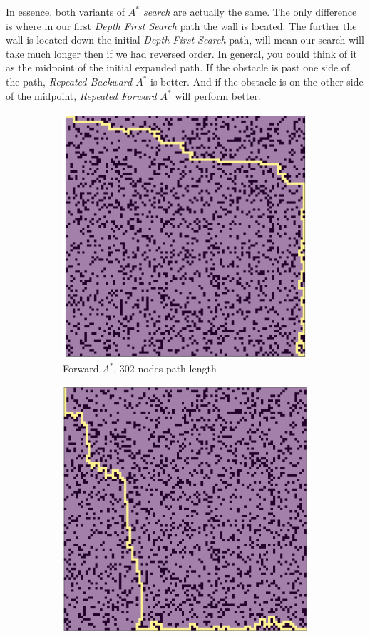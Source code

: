 In essence, both variants of \emph{$A^*$ search} are actually the same. The only difference is where in our first \emph{Depth First Search} path the wall is located. The further the wall is located down the initial \emph{Depth First Search} path, will mean our search will take much longer then if we had reversed order. In general, you could think of it as the midpoint of the initial expanded path. If the obstacle is past one side of the path, \emph{Repeated Backward $A^*$} is better. And if the obstacle is on the other side of the midpoint, \emph{Repeated Forward $A^*$} will perform better.

\begin{figure}[H]
\begin{subfigure}{.5\textwidth}
  \centering
  \includegraphics[width=0.8\linewidth]{Report/Part3/larger_g_forward_302.png}  
  \caption{Forward $A^*$, 302 nodes path length}
\end{subfigure}
\begin{subfigure}{.5\textwidth}
  \centering
  \includegraphics[width=0.8\linewidth]{Report/Part3/larger_g_backward_339.png}  

\end{subfigure}
\end{figure}
